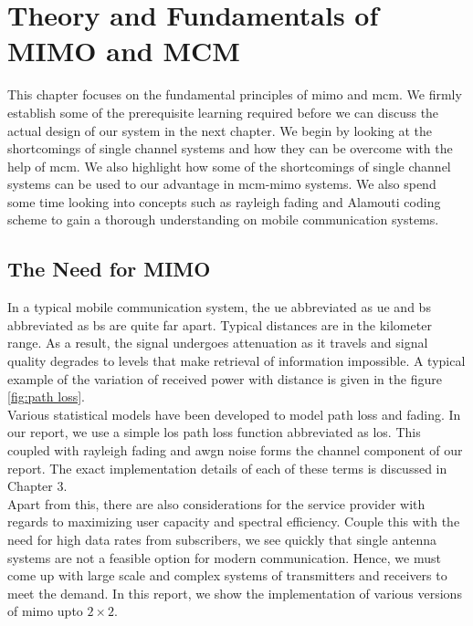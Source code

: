 \chapter{Theory and Fundamentals of MIMO and MCM}
This chapter focuses on the fundamental principles of \acrshort{mimo} and \acrshort{mcm}. We firmly establish some of the prerequisite learning required before we can discuss the actual design of our system in the next chapter. We begin by looking at the shortcomings of single channel systems and how they can be overcome with the help of \acrshort{mcm}. We also highlight how some of the shortcomings of single channel systems can be used to our advantage in \acrshort{mcm}-\acrshort{mimo} systems. We also spend some time looking into concepts such as \gls{rayleigh fading} and Alamouti coding scheme to gain a thorough understanding on mobile communication systems.

\section{The Need for MIMO}

In a typical mobile communication system, the \acrlong{ue} abbreviated as \acrshort{ue} and \acrlong{bs} abbreviated as \acrshort{bs} are quite far apart. Typical distances are in the kilometer range. As a result, the signal undergoes attenuation as it travels and signal quality degrades to levels that make retrieval of information impossible. A typical example of the variation of received power with distance is given in the figure \ref{fig:path loss}.\\
Various statistical models have been developed to model path loss and fading. In our report, we use a simple \acrlong{los} path loss function abbreviated as \acrshort{los}. This coupled with \gls{rayleigh fading} and \acrshort{awgn} noise forms the channel component of our report. The exact implementation details of each of these terms is discussed in Chapter 3.\\

Apart from this, there are also considerations for the service provider with regards to maximizing user capacity and spectral efficiency. Couple this with the need for high data rates from subscribers, we see quickly that single antenna systems are not a feasible option for modern communication. Hence, we must come up with large scale and complex systems of transmitters and receivers to meet the demand. In this report, we show the implementation of various versions of \acrshort{mimo} upto $2 \times 2$.  

